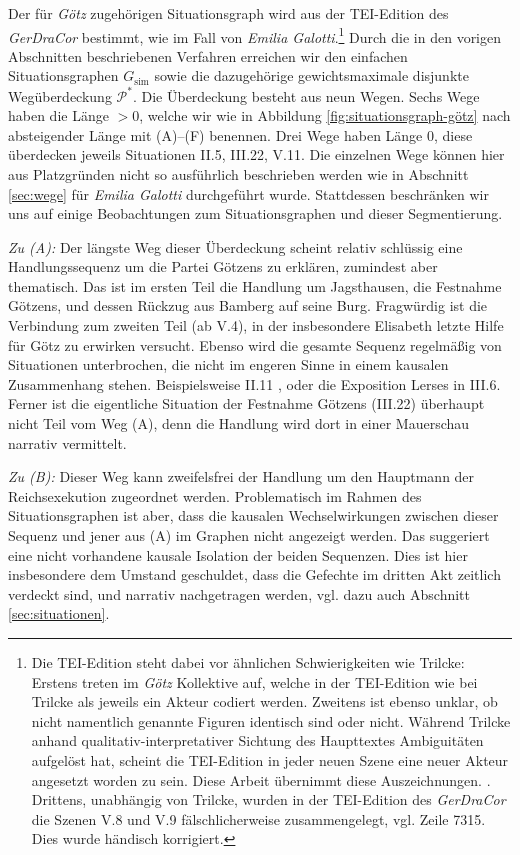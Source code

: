 \documentclass[a4paper,10pt,abstract=true,headings=small]{scrartcl}
\begin{document}
Der für \emph{Götz} zugehörigen Situationsgraph wird aus der TEI-Edition des \emph{GerDraCor} bestimmt, wie im Fall von \emph{Emilia Galotti}.\footnote{
Die TEI-Edition steht dabei vor ähnlichen Schwierigkeiten wie Trilcke:
Erstens treten im \emph{Götz} Kollektive auf, welche in der TEI-Edition wie bei Trilcke als jeweils ein Akteur codiert werden.
Zweitens ist ebenso unklar, ob nicht namentlich genannte Figuren identisch sind oder nicht.
Während Trilcke anhand qualitativ-interpretativer Sichtung des Haupttextes Ambiguitäten aufgelöst hat, scheint die TEI-Edition in jeder neuen Szene eine neuer Akteur angesetzt worden zu sein.
Diese Arbeit übernimmt diese Auszeichnungen.
\cite[Vgl.][Fn.~77]{trilcke_social_2013}.
Drittens, unabhängig von Trilcke, wurden in der TEI-Edition des \emph{GerDraCor} die Szenen V.8 und V.9 fälschlicherweise zusammengelegt, vgl. Zeile 7315. Dies wurde händisch korrigiert. 
}
Durch die in den vorigen Abschnitten beschriebenen Verfahren erreichen wir den einfachen Situationsgraphen $G_\text{sim}$ sowie die dazugehörige gewichtsmaximale disjunkte Wegüberdeckung $\mathcal{P}^*$.
Die Überdeckung besteht aus neun Wegen.
Sechs Wege haben die Länge $>0$, welche wir wie in Abbildung \ref{fig:situationsgraph-götz} nach absteigender Länge mit (A)–(F) benennen.
Drei Wege haben Länge $0$, diese überdecken jeweils Situationen II.5, III.22, V.11.
Die einzelnen Wege können hier aus Platzgründen nicht so ausführlich beschrieben werden wie in Abschnitt \ref{sec:wege} für \emph{Emilia Galotti} durchgeführt wurde.
Stattdessen beschränken wir uns auf einige Beobachtungen zum Situationsgraphen und dieser Segmentierung.

\emph{Zu (A):} Der längste Weg dieser Überdeckung scheint relativ schlüssig eine Handlungssequenz um die Partei Götzens zu erklären, zumindest aber thematisch.
Das ist im ersten Teil die Handlung um Jagsthausen, die Festnahme Götzens, und dessen Rückzug aus Bamberg auf seine Burg.
Fragwürdig ist die Verbindung zum zweiten Teil (ab V.4), in der insbesondere Elisabeth letzte Hilfe für Götz zu erwirken versucht.
Ebenso wird die gesamte Sequenz regelmäßig von Situationen unterbrochen, die nicht im engeren Sinne in einem kausalen Zusammenhang stehen.
Beispielsweise II.11 , oder die Exposition Lerses in III.6.
Ferner ist die eigentliche Situation der Festnahme Götzens (III.22) überhaupt nicht Teil vom Weg (A), denn die Handlung wird dort in einer Mauerschau narrativ vermittelt.

\emph{Zu (B):} Dieser Weg kann zweifelsfrei der Handlung um den Hauptmann der Reichsexekution zugeordnet werden.
Problematisch im Rahmen des Situationsgraphen ist aber, dass die kausalen Wechselwirkungen zwischen dieser Sequenz und jener aus (A) im Graphen nicht angezeigt werden.
Das suggeriert eine nicht vorhandene kausale Isolation der beiden Sequenzen.
Dies ist hier insbesondere dem Umstand geschuldet, dass die Gefechte im dritten Akt zeitlich verdeckt sind, und narrativ nachgetragen werden, vgl. dazu auch Abschnitt \ref{sec:situationen}.
\end{document}
